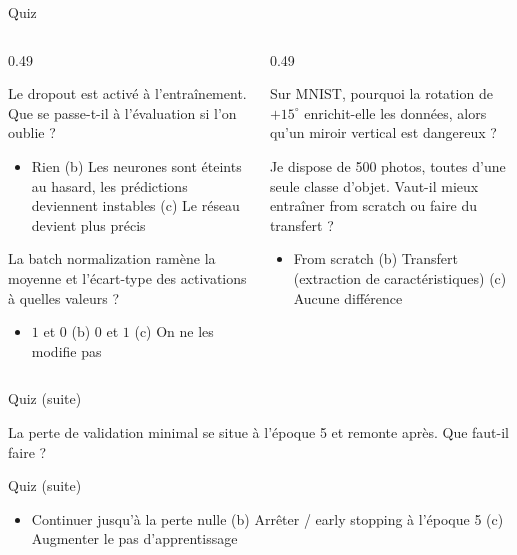 \begin{frame}{Quiz}
\begin{columns}[t]
\begin{column}{0.49\textwidth}
\begin{qbox}[Question 1]
Le dropout est activé à l'entraînement. Que se passe-t-il à l'évaluation si
l'on oublie  ?
\begin{itemize}
  \item[(a)] Rien \quad (b) Les neurones sont éteints au hasard, les prédictions
  deviennent instables \quad (c) Le réseau devient plus précis
\end{itemize}
\end{qbox}
\begin{qbox}[Question 2]
La batch normalization ramène la moyenne et l'écart-type des activations à
quelles valeurs ?
\begin{itemize}
  \item[(a)] $1$ et $0$ \quad (b) $0$ et $1$ \quad (c) On ne les modifie pas
\end{itemize}
\end{qbox}
\end{column}
\begin{column}{0.49\textwidth}
\begin{qbox}[Question 3]
Sur MNIST, pourquoi la rotation de $+15^\circ$ enrichit-elle les données, alors
qu'un miroir vertical est dangereux ?
\end{qbox}
\begin{qbox}[Question 4]
Je dispose de 500 photos, toutes d'une seule classe d'objet. Vaut-il mieux
entraîner from scratch ou faire du transfert ?
\begin{itemize}
  \item[(a)] From scratch \quad (b) Transfert (extraction de caractéristiques)
  \quad (c) Aucune différence
\end{itemize}
\end{qbox}
\end{column}
\end{columns}


\end{frame}
\begin{frame}{Quiz (suite)}
\begin{qbox}[Question 5]
La perte de validation minimal se situe à l'époque 5 et remonte après. Que
faut-il faire ?

\end{qbox}
\end{frame}
\begin{frame}{Quiz (suite)}
\begin{itemize}
  \item[(a)] Continuer jusqu'à la perte nulle \quad (b) Arrêter / early stopping
  à l'époque 5 \quad (c) Augmenter le pas d'apprentissage
\end{itemize}
\end{frame}

